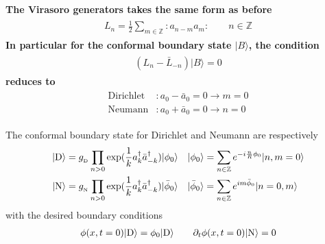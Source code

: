 {\bf\color{red}
The Virasoro generators takes the same form as before
\begin{eqnarray}\begin{aligned}
L_n=\frac{1}{2}\sum_{m\in\mathbb{Z}}:a_{n-m}a_m:\qquad n\in\mathbb{Z}
\end{aligned}\end{eqnarray}
In particular for the conformal boundary state $|B\rangle$, the condition
\begin{eqnarray}\begin{aligned}
(L_n-\bar{L}_{-n})|B\rangle=0
\end{aligned}\end{eqnarray}
reduces to 
\begin{eqnarray}\begin{aligned}
\label{eq:DN_a}
\text{Dirichlet}&:a_0-\bar{a}_0=0\rightarrow m=0 \\
\text{Neumann}&:a_0+\bar{a}_0=0\rightarrow n=0
\end{aligned}\end{eqnarray}
}

The conformal boundary state for Dirichlet and Neumann are respectively
\begin{eqnarray}\begin{aligned}
\label{eq:DN_state}
|{\rm D} \rangle  &= g_{\,\!_\text{D}}  \prod_{n > 0 } \exp(\frac{1}{k} a_k^{\dagger} \bar{a}_{-k}^{\dagger} )| \phi_0 \rangle \quad | \phi_0 \rangle = \sum_{n \in \mathbb{Z}} e^{-i \frac{n}{R}\phi_0 } | n, m = 0 \rangle \\
| {\rm N} \rangle &= g_{\,\!_\text{N}} \prod_{n > 0 } \exp(\frac{1}{k} a_k^{\dagger} \bar{a}_{-k}^{\dagger} )| \bar{\phi}_0 \rangle \quad | \bar{\phi}_0 \rangle = \sum_{n \in \mathbb{Z}} e^{i m \bar{\phi}_0 } | n = 0, m \rangle 
\end{aligned}\end{eqnarray}
with the desired boundary conditions
\begin{eqnarray}\begin{aligned}
\phi(x,t=0)|{\rm D} \rangle=\phi_0|{\rm D} \rangle\qquad \partial_t \phi( x, t = 0 ) | {\rm N } \rangle = 0
\end{aligned}\end{eqnarray}

